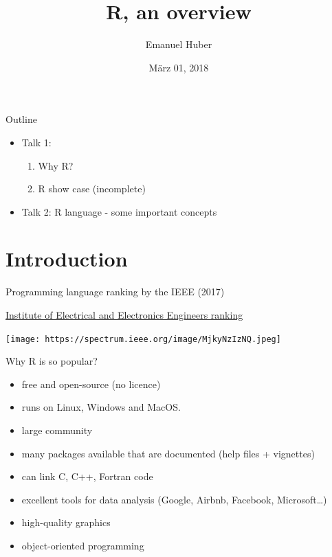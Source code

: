 \documentclass[8pt,ignorenonframetext,]{beamer}
\title{R, an overview}
\author{Emanuel Huber}
\date{März 01, 2018}
\providecommand{\tightlist}{%
  \setlength{\itemsep}{0pt}\setlength{\parskip}{0pt}}
\begin{document}
\frame{\titlepage}

\begin{frame}

\end{frame}

\begin{frame}{Outline}

\begin{itemize}
\tightlist
\item
  Talk 1:

  \begin{enumerate}
  \def\labelenumi{\arabic{enumi}.}
  \tightlist
  \item
    Why R?
  \item
    R show case (incomplete)\\
  \end{enumerate}
\item
  Talk 2: R language - some important concepts
\end{itemize}

\end{frame}

\section{Introduction}\label{introduction}

\begin{frame}{Programming language ranking by the IEEE (2017)}

\href{https://spectrum.ieee.org/computing/software/the-2017-top-programming-languages}{Institute
of Electrical and Electronics Engineers ranking}

\texttt{[image: https://spectrum.ieee.org/image/MjkyNzIzNQ.jpeg]}

\end{frame}

\begin{frame}{Why R is so popular?}

\begin{itemize}
\tightlist
\item
  free and open-source (no licence)
\item
  runs on Linux, Windows and MacOS.
\item
  large community
\item
  many packages available that are documented (help files + vignettes)
\item
  can link C, C++, Fortran code
\item
  excellent tools for data analysis (Google, Airbnb, Facebook,
  Microsoft\ldots{})
\item
  high-quality graphics
\item
  object-oriented programming
\end{itemize}

\end{frame}
\end{document}
